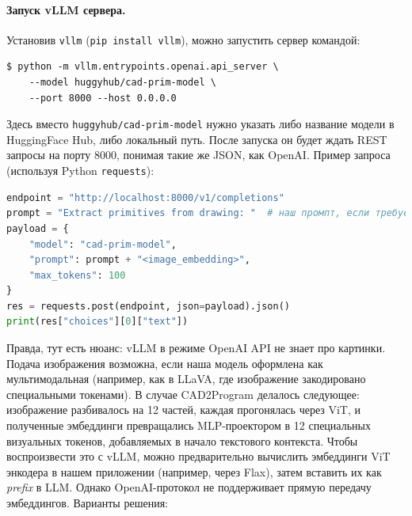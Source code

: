 \documentclass{article}
\begin{document}
\paragraph{Запуск vLLM сервера.} Установив \texttt{vllm} (\texttt{pip install vllm}), можно запустить сервер командой:
\begin{verbatim}
$ python -m vllm.entrypoints.openai.api_server \
    --model huggyhub/cad-prim-model \
    --port 8000 --host 0.0.0.0
\end{verbatim}
Здесь вместо \texttt{huggyhub/cad-prim-model} нужно указать либо название модели в HuggingFace Hub, либо локальный путь. После запуска он будет ждать REST запросы на порту 8000, понимая такие же JSON, как OpenAI. Пример запроса (используя Python \texttt{requests}):
\begin{lstlisting}[language=Python]
endpoint = "http://localhost:8000/v1/completions"
prompt = "Extract primitives from drawing: "  # наш промпт, если требуется
payload = {
    "model": "cad-prim-model",
    "prompt": prompt + "<image_embedding>",
    "max_tokens": 100
}
res = requests.post(endpoint, json=payload).json()
print(res["choices"][0]["text"])
\end{lstlisting}
Правда, тут есть нюанс: vLLM в режиме OpenAI API не знает про картинки. Подача изображения возможна, если наша модель оформлена как мультимодальная (например, как в LLaVA, где изображение закодировано специальными токенами). В случае CAD2Program делалось следующее: изображение разбивалось на 12 частей, каждая прогонялась через ViT, и полученные эмбеддинги превращались MLP-проектором в 12 специальных визуальных токенов, добавляемых в начало текстового контекста. Чтобы воспроизвести это с vLLM, можно предварительно вычислить эмбеддинги ViT энкодера в нашем приложении (например, через Flax), затем вставить их как \emph{prefix} в LLM. Однако OpenAI-протокол не поддерживает прямую передачу эмбеддингов. Варианты решения:
\end{document}
